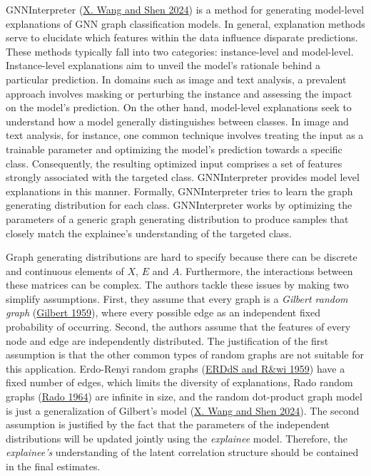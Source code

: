 \documentclass[
  11pt,
  letterpaper,
]{article}
\begin{document}
\quad GNNInterpreter (\protect\hyperlink{ref-Wang_Shen_2024}{X. Wang and
Shen 2024}) is a method for generating model-level explanations of GNN
graph classification models. In general, explanation methods serve to
elucidate which features within the data influence disparate
predictions. These methods typically fall into two categories:
instance-level and model-level. Instance-level explanations aim to
unveil the model's rationale behind a particular prediction. In domains
such as image and text analysis, a prevalent approach involves masking
or perturbing the instance and assessing the impact on the model's
prediction. On the other hand, model-level explanations seek to
understand how a model generally distinguishes between classes. In image
and text analysis, for instance, one common technique involves treating
the input as a trainable parameter and optimizing the model's prediction
towards a specific class. Consequently, the resulting optimized input
comprises a set of features strongly associated with the targeted class.
GNNInterpreter provides model level explanations in this manner.
Formally, GNNInterpreter tries to learn the graph generating
distribution for each class. GNNInterpreter works by optimizing the
parameters of a generic graph generating distribution to produce samples
that closely match the explainee's understanding of the targeted class.

\quad Graph generating distributions are hard to specify because there
can be discrete and continuous elements of \(X\), \(E\) and \(A\).
Furthermore, the interactions between these matrices can be complex. The
authors tackle these issues by making two simplify assumptions. First,
they assume that every graph is a \emph{Gilbert random graph}
(\protect\hyperlink{ref-Gilbert_1959}{Gilbert 1959}), where every
possible edge as an independent fixed probability of occurring. Second,
the authors assume that the features of every node and edge are
independently distributed. The justification of the first assumption is
that the other common types of random graphs are not suitable for this
application. Erdo-Renyi random graphs
(\protect\hyperlink{ref-erdds1959random}{ERDdS and R\&wi 1959}) have a
fixed number of edges, which limits the diversity of explanations, Rado
random graphs (\protect\hyperlink{ref-Rado1964UniversalGA}{Rado 1964})
are infinite in size, and the random dot-product graph model is just a
generalization of Gilbert's model
(\protect\hyperlink{ref-Wang_Shen_2024}{X. Wang and Shen 2024}). The
second assumption is justified by the fact that the parameters of the
independent distributions will be updated jointly using the
\emph{explainee} model. Therefore, the \emph{explainee's} understanding
of the latent correlation structure should be contained in the final
estimates.
\end{document}
